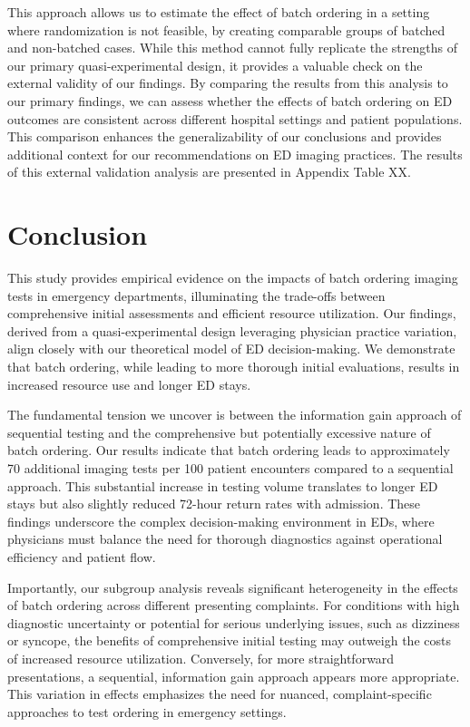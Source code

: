 \documentclass[,,nonblindrev]{informs}
\begin{document}
This approach allows us to estimate the effect of batch ordering in a
setting where randomization is not feasible, by creating comparable
groups of batched and non-batched cases. While this method cannot fully
replicate the strengths of our primary quasi-experimental design, it
provides a valuable check on the external validity of our findings. By
comparing the results from this analysis to our primary findings, we can
assess whether the effects of batch ordering on ED outcomes are
consistent across different hospital settings and patient populations.
This comparison enhances the generalizability of our conclusions and
provides additional context for our recommendations on ED imaging
practices. The results of this external validation analysis are
presented in Appendix Table XX.

\hypertarget{conclusion}{%
\section{Conclusion}\label{conclusion}}

This study provides empirical evidence on the impacts of batch ordering
imaging tests in emergency departments, illuminating the trade-offs
between comprehensive initial assessments and efficient resource
utilization. Our findings, derived from a quasi-experimental design
leveraging physician practice variation, align closely with our
theoretical model of ED decision-making. We demonstrate that batch
ordering, while leading to more thorough initial evaluations, results in
increased resource use and longer ED stays.

The fundamental tension we uncover is between the information gain
approach of sequential testing and the comprehensive but potentially
excessive nature of batch ordering. Our results indicate that batch
ordering leads to approximately 70 additional imaging tests per 100
patient encounters compared to a sequential approach. This substantial
increase in testing volume translates to longer ED stays but also
slightly reduced 72-hour return rates with admission. These findings
underscore the complex decision-making environment in EDs, where
physicians must balance the need for thorough diagnostics against
operational efficiency and patient flow.

Importantly, our subgroup analysis reveals significant heterogeneity in
the effects of batch ordering across different presenting complaints.
For conditions with high diagnostic uncertainty or potential for serious
underlying issues, such as dizziness or syncope, the benefits of
comprehensive initial testing may outweigh the costs of increased
resource utilization. Conversely, for more straightforward
presentations, a sequential, information gain approach appears more
appropriate. This variation in effects emphasizes the need for nuanced,
complaint-specific approaches to test ordering in emergency settings.
\end{document}
